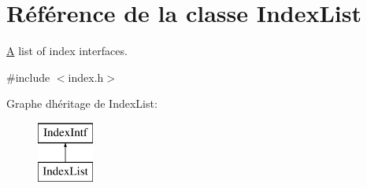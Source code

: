 \hypertarget{class_index_list}{}\section{Référence de la classe Index\+List}
\label{class_index_list}


\hyperlink{class_a}{A} list of index interfaces.  




{\ttfamily \#include $<$index.\+h$>$}

Graphe d\textquotesingle{}héritage de Index\+List\+:\begin{figure}[H]
\begin{center}
\leavevmode
\includegraphics[height=2.000000cm]{class_index_list}
\end{center}
\end{figure}
